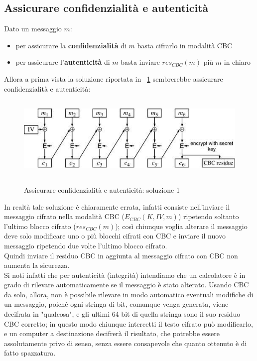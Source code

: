 \subsection{Assicurare confidenzialità e autenticità}
Dato un messaggio $m$:
\begin{itemize}
\item per assicurare la \textbf{confidenzialità} di $m$ basta cifrarlo in modalità CBC
\item per assicurare l'\textbf{autenticità} di $m$ basta inviare $res_{CBC}(m)$ più $m$ in chiaro
\end{itemize}
Allora a prima vista la soluzione riportata in \figurename ~\ref{fig:residuo_CBC_1} sembrerebbe assicurare confidenzialità e autenticità:
\begin{figure}[htbp]
	\centering%
	\subfigure%
	{\includegraphics[height=4cm, width=12cm, keepaspectratio]{Immagini/Capitolo3/residuo_CBC_1.png}}
	\caption{Assicurare confidenzialità e autenticità: soluzione 1 \label{fig:residuo_CBC_1}} 	
\end{figure}
In realtà tale soluzione è chiaramente errata, infatti consiste nell'inviare il messaggio cifrato nella modalità CBC ($E_{CBC}(K, IV, m)$) ripetendo soltanto l'ultimo blocco cifrato ($res_{CBC}(m)$); così chiunque voglia alterare il messaggio deve solo modificare uno o più blocchi cifrati con CBC e inviare il nuovo messaggio ripetendo due volte l'ultimo blocco cifrato. \\
Quindi inviare il residuo CBC in aggiunta al messaggio cifrato con CBC non aumenta la sicurezza. \\ 
Si noti infatti che per autenticità (integrità) intendiamo che un calcolatore è in grado di rilevare automaticamente se il messaggio è stato alterato. Usando CBC da solo, allora, non è possibile rilevare in
modo automatico eventuali modifiche di un messaggio, poiché ogni stringa di bit, comunque venga generata, viene decifrata in "qualcosa", e gli ultimi 64 bit di quella stringa sono il suo residuo CBC corretto; in questo modo chiunque intercetti il testo cifrato può modificarlo, e un computer a destinazione decifrerà il risultato, che potrebbe essere assolutamente privo di senso, senza essere consapevole che quanto ottenuto è di fatto spazzatura. \\
